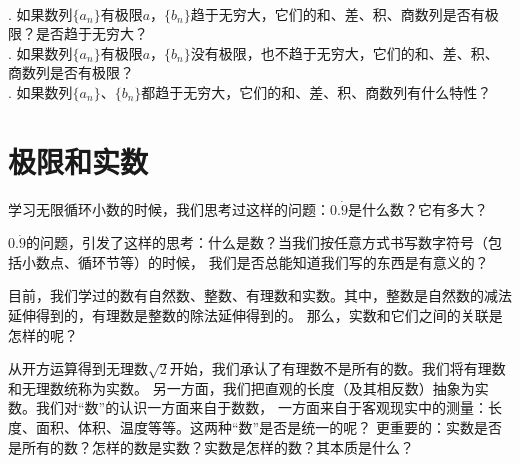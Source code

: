 \documentclass[12pt,UTF8,fontset=none]{ctexbook}
\begin{document}
\begin{sk}
    \mbox{} \\
    . 如果数列$\{a_n\}$有极限$a$，$\{b_n\}$趋于无穷大，它们的和、差、积、商数列是否有极限？是否趋于无穷大？\\
    . 如果数列$\{a_n\}$有极限$a$，$\{b_n\}$没有极限，也不趋于无穷大，它们的和、差、积、商数列是否有极限？\\
    . 如果数列$\{a_n\}$、$\{b_n\}$都趋于无穷大，它们的和、差、积、商数列有什么特性？
\end{sk}

\section{极限和实数}
\begin{center}
\end{center}

学习无限循环小数的时候，我们思考过这样的问题：$0.\dot{9}$是什么数？它有多大？

$0.\dot{9}$的问题，引发了这样的思考：什么是数？当我们按任意方式书写数字符号（包括小数点、循环节等）的时候，
我们是否总能知道我们写的东西是有意义的？

目前，我们学过的数有自然数、整数、有理数和实数。其中，整数是自然数的减法延伸得到的，有理数是整数的除法延伸得到的。
那么，实数和它们之间的关联是怎样的呢？

从开方运算得到无理数$\sqrt{2}$开始，我们承认了有理数不是所有的数。我们将有理数和无理数统称为实数。
另一方面，我们把直观的长度（及其相反数）抽象为实数。我们对“数”的认识一方面来自于数数，
一方面来自于客观现实中的测量：长度、面积、体积、温度等等。这两种“数”是否是统一的呢？
更重要的：实数是否是所有的数？怎样的数是实数？实数是怎样的数？其本质是什么？
\end{document}
